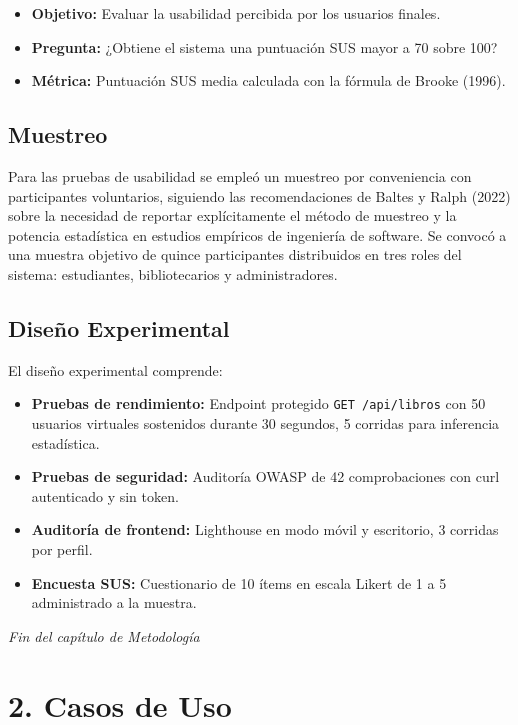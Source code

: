 \documentclass[
11pt,
a4paper,
]{report}
\begin{document}
	\begin{itemize}
		\item \textbf{Objetivo:} Evaluar la usabilidad percibida por los usuarios finales.
		\item \textbf{Pregunta:} ¿Obtiene el sistema una puntuación SUS mayor a 70 sobre 100?
		\item \textbf{Métrica:} Puntuación SUS media calculada con la fórmula de Brooke (1996).
	\end{itemize}
	
	\hypertarget{muestreo}{%
		\section{Muestreo}\label{muestreo}}
	
	Para las pruebas de usabilidad se empleó un muestreo por conveniencia con participantes voluntarios, siguiendo las recomendaciones de Baltes y Ralph (2022) sobre la necesidad de reportar explícitamente el método de muestreo y la potencia estadística en estudios empíricos de ingeniería de software. Se convocó a una muestra objetivo de quince participantes distribuidos en tres roles del sistema: estudiantes, bibliotecarios y administradores.
	
	\hypertarget{diseno-experimental}{%
		\section{Diseño Experimental}\label{diseno-experimental}}
	
	El diseño experimental comprende:
	
	\begin{itemize}
		\item \textbf{Pruebas de rendimiento:} Endpoint protegido \texttt{GET /api/libros} con 50 usuarios virtuales sostenidos durante 30 segundos, 5 corridas para inferencia estadística.
		\item \textbf{Pruebas de seguridad:} Auditoría OWASP de 42 comprobaciones con curl autenticado y sin token.
		\item \textbf{Auditoría de frontend:} Lighthouse en modo móvil y escritorio, 3 corridas por perfil.
		\item \textbf{Encuesta SUS:} Cuestionario de 10 ítems en escala Likert de 1 a 5 administrado a la muestra.
	\end{itemize}
	
	\emph{Fin del capítulo de Metodología}
	
	\hypertarget{casos-de-uso}{%
		\chapter{2. Casos de Uso}\label{casos-de-uso}}
	
\end{document}
